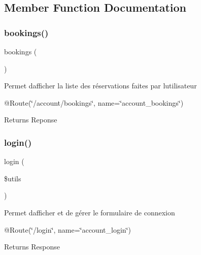 \subsection{Member Function Documentation}
\mbox{\label{class_app_1_1_controller_1_1_account_controller_a0f99f07a00cb13e77cd7aa42d1ee5b43}} 
\subsubsection{\texorpdfstring{bookings()}{bookings()}}
{\footnotesize\ttfamily bookings (\begin{DoxyParamCaption}{ }\end{DoxyParamCaption})}

Permet d\textquotesingle{}afficher la liste des réservations faites par l\textquotesingle{}utilisateur

@\+Route(\char`\"{}/account/bookings\char`\"{}, name=\char`\"{}account\+\_\+bookings\char`\"{})

\begin{DoxyReturn}{Returns}
Reponse 
\end{DoxyReturn}
\mbox{\label{class_app_1_1_controller_1_1_account_controller_a8450f41ecb91498fc9e3bce1d9d65ab9}} 
\subsubsection{\texorpdfstring{login()}{login()}}
{\footnotesize\ttfamily login (\begin{DoxyParamCaption}\item[{Authentication\+Utils}]{\$utils }\end{DoxyParamCaption})}

Permet d\textquotesingle{}afficher et de gérer le formulaire de connexion

@\+Route(\char`\"{}/login\char`\"{}, name=\char`\"{}account\+\_\+login\char`\"{})

\begin{DoxyReturn}{Returns}
Response 
\end{DoxyReturn}
\mbox{\label{class_app_1_1_controller_1_1_account_controller_a082405d89acd6835c3a7c7a08a7adbab}} 
